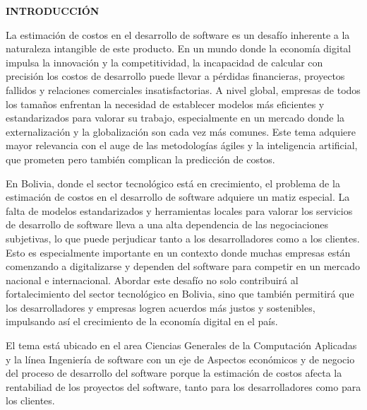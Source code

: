 \begin{center}
    {\LARGE \textbf{INTRODUCCIÓN}} %
\end{center}

La estimación de costos en el desarrollo de software es un desafío inherente a la naturaleza intangible de este producto. En un mundo donde la economía digital impulsa la innovación y la competitividad, la incapacidad de calcular con precisión los costos de desarrollo puede llevar a pérdidas financieras, proyectos fallidos y relaciones comerciales insatisfactorias. A nivel global, empresas de todos los tamaños enfrentan la necesidad de establecer modelos más eficientes y estandarizados para valorar su trabajo, especialmente en un mercado donde la externalización y la globalización son cada vez más comunes. Este tema adquiere mayor relevancia 
con el auge de las metodologías ágiles y la inteligencia artificial, que prometen pero también complican la predicción de costos.

En Bolivia, donde el sector tecnológico está en crecimiento, el problema de la estimación de costos en el desarrollo de software adquiere un matiz especial. La falta de modelos estandarizados y herramientas locales para valorar los servicios de desarrollo de software lleva a una alta dependencia de las negociaciones subjetivas, lo que puede perjudicar tanto a los desarrolladores como a los clientes. Esto es especialmente importante en un contexto donde muchas empresas están comenzando a digitalizarse y dependen del software para competir en un mercado nacional e internacional. Abordar este desafío no solo contribuirá al fortalecimiento del sector tecnológico en Bolivia, sino que también permitirá que los desarrolladores y empresas logren acuerdos más justos y sostenibles, impulsando así el crecimiento de la economía digital en el país.

El tema está ubicado en el area 
Ciencias Generales de la Computación Aplicadas y la 
línea Ingeniería de software con un eje de 
Aspectos económicos y de negocio del proceso de desarrollo del software porque la estimación de costos afecta la 
rentabiliad de los proyectos del software, tanto para los desarrolladores
como para los clientes.